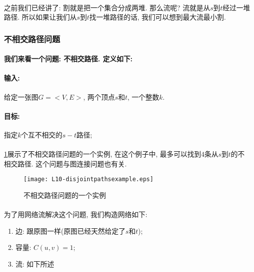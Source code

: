         \paragraph{}之前我们已经讲了: 割就是把一个集合分成两堆. 那么流呢? 流就是从$s$到$t$经过一堆路径. 所以如果让我们从$s$到$t$找一堆路径的话, 我们可以想到最大流最小割.
        \subsubsection{不相交路径问题}
        \paragraph{我们来看一个问题: 不相交路径. 定义如下:}
        \paragraph{输入:}给定一张图$G=<V,E>$, 两个顶点$s$和$t$, 一个整数$k$.
        \paragraph{目标:}指定$k$个互不相交的$s-t$路径;
        \paragraph{}\figurename\ref{Figure: disjoint_path_example}展示了不相交路径问题的一个实例, 在这个例子中, 最多可以找到$4$条从$s$到$t$的不相交路径. 这个问题与图连接问题也有关. 
        \begin{figure}[h]
            \centering
            \texttt{[image: L10-disjointpathsexample.eps]}
            \caption{不相交路径问题的一个实例}
            \label{Figure: disjoint_path_example}
        \end{figure}
        
        \paragraph{}为了用网络流解决这个问题, 我们构造网络如下:
        \begin{enumerate}
         \item 边: 跟原图一样(原图已经天然给定了$s$和$t$);
         \item 容量: $C(u,v)=1$;
         \item 流: 如下所述%
        \end{enumerate}
